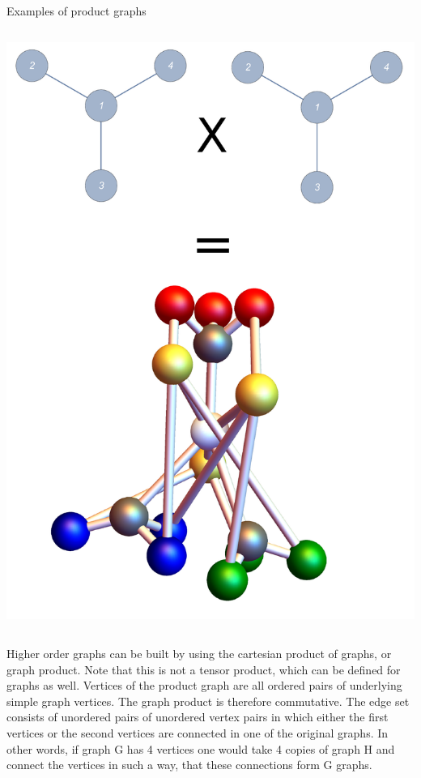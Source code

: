 {\begin{frame}{Examples of product graphs}
\begin{columns}[T]
{\begin{column}{0.33\textwidth}
     		\includegraphics[trim=30mm 0 0 0, width=\textwidth]{Images/graphprod_switch_square}
		\end{column}}
	\end{columns}
\end{frame}}

\begin{center}
\end{center}

\noindent Higher order graphs can be built by using the cartesian product of graphs, or graph product. Note that this is not a tensor product, which can be defined for graphs as well. Vertices of the product graph are all ordered pairs of underlying simple graph vertices. The graph product is therefore commutative. The edge set consists of unordered pairs of unordered vertex pairs in which either the first vertices or the second vertices are connected in one of the original graphs. In other words, if graph G has 4 vertices one would take 4 copies of graph H and connect the vertices in such a way, that these connections form G graphs. 

